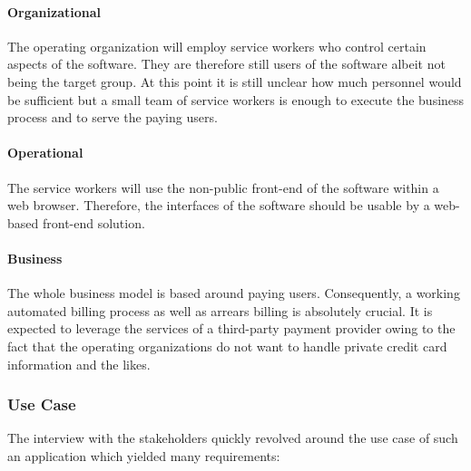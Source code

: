 \documentclass[12pt,a4paper,twoside]{report}
\begin{document}
\paragraph{Organizational}
The operating organization will employ service workers who
control certain aspects of the software. They are therefore still users of the
software albeit not being the target group. At this point it is still unclear
how much personnel would be sufficient but a small team of service workers is
enough to execute the business process and to serve the paying users.

\paragraph{Operational}
The service workers will use the non-public front-end of the software within a
web browser. Therefore, the interfaces of the software should be usable by
a web-based front-end solution.

\paragraph{Business}
The whole business model is based around paying users. Consequently,
a working automated billing process as well as arrears billing is absolutely
crucial. It is expected to leverage the services of a third-party payment
provider owing to the fact that the operating organizations do not want to
handle private credit card information and the likes.


\subsubsection{Use Case}

The interview with the stakeholders quickly revolved around the use case
of such an application which yielded many requirements:\\
\end{document}
